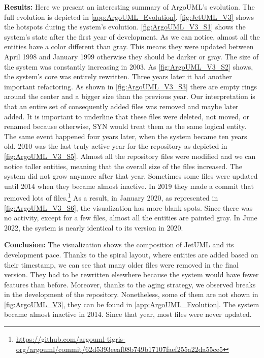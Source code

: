 \textbf{Results:}
Here we present an interesting summary of ArgoUML's evolution. The full evolution is depicted in  \autoref{app:ArgoUML_Evolution}. \autoref{fig:JetUML_V3} shows the hotspots during the system's evolution. \autoref{fig:ArgoUML_V3_S1} shows the system's state after the first year of development. As we can notice, almost all the entities have a color different than gray. This means they were updated between April 1998 and January 1999 otherwise they should be darker or gray. The size of the system was constantly increasing in 2003. As \autoref{fig:ArgoUML_V3_S2} shows, the system's core was entirely rewritten. Three years later it had another important refactoring. As shown in \autoref{fig:ArgoUML_V3_S3} there are empty rings around the center and a bigger size than the previous year. Our interpretation is that an entire set of consequently added files was removed and maybe later added. It is important to underline that these files were deleted, not moved, or renamed because otherwise, SYN would treat them as the same logical entity. The same event happened four years later, when the system became ten years old. 2010 was the last truly active year for the repository as depicted in \autoref{fig:ArgoUML_V3_S5}. Almost all the repository files were modified and we can notice taller entities, meaning that the overall size of the files increased. The system did not grow anymore after that year. Sometimes some files were updated until 2014 when they became almost inactive. In 2019 they made a commit that removed lots of files.\footnote{\url{https://github.com/argouml-tigris-org/argouml/commit/62d5393eeaf08b749b17107faef255a22da55ce5}} As a result, in January 2020, as represented in \autoref{fig:ArgoUML_V3_S6}, the visualization has more blank spots. Since there was no activity, except for a few files, almost all the entities are painted gray. In June 2022, the system is nearly identical to its version in 2020. 

\bigbreak
\textbf{Conclusion:}
The visualization shows the composition of JetUML and its development pace. Thanks to the spiral layout, where entities are added based on their timestamp, we can see that many older files were removed in the final version. They had to be rewritten elsewhere because the system would have fewer features than before. Moreover, thanks to the aging strategy, we observed breaks in the development of the repository. Nonetheless, some of them are not shown in \autoref{fig:ArgoUML_V3}, they can be found in \autoref{app:ArgoUML_Evolution}. The system became almost inactive in 2014. Since that year, most files were never updated. 



